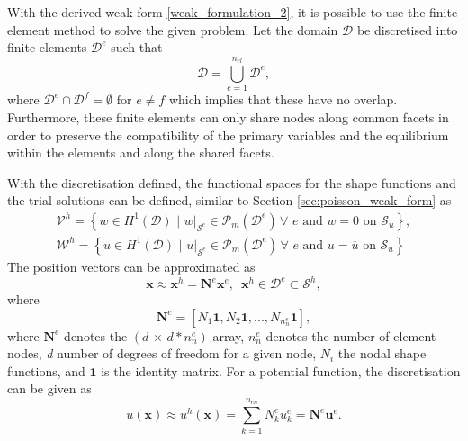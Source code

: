 With the derived weak form \eqref{weak_formulation_2}, it is possible to use the finite element method to solve the given problem.
Let the domain $\mathcal{D}$ be discretised into finite elements $\mathcal{D}^{e}$ such that
\begin{equation}\label{discretisation_definition}
    {\mathcal{D}} = \bigcup^{n_{el}}_{e=1} {\mathcal{D}}^{e},
\end{equation}
where $\mathcal{D}^{e} \cap \mathcal{D}^{f} = \emptyset \, \, \text{for } e \neq f$ which implies that these have no overlap.
 Furthermore, these finite elements can only share nodes along common facets in order to preserve the compatibility 
 of the primary variables and the equilibrium within the elements and along the shared facets. 
 
With the discretisation defined, the functional spaces for the shape functions and the trial solutions can be defined, similar to Section
 \ref{sec:poisson_weak_form} as
\begin{align}\label{discretised_spaces}
    \mathcal{V}^{h} = \left\{w \in H^{1}(\mathcal{D})\,\, |\,\, w|_{\mathcal{S}^{e}} \in \mathcal{P}_{m}(\mathcal{D}^{e}) \, \forall \,\, e \text{ and } w = 0 \,\, \text{on } \mathcal{S}_{u}\right\},\\
    \mathcal{W}^{h} = \left\{u \in H^{1}(\mathcal{D})\,\, |\,\, u|_{\mathcal{S}^{e}} \in \mathcal{P}_{m}(\mathcal{D}^{e}) \, \forall \,\, e \text{ and } u = \overline{u} \,\, \text{on } \mathcal{S}_{u}\right\}
\end{align}
%
The position vectors can be approximated as
\begin{equation} \label{pos_vectors}
    \boldsymbol{x} \approx \boldsymbol{x}^{h} = \mathbf{N}^{e}\mathbf{x}^{e}, \,\,\, \boldsymbol{x}^{h} \in \mathcal{D}^{e} \subset \mathcal{S}^{h},
\end{equation}
where
\begin{equation} \label{shape_functions}
    \mathbf{N}^{e} = [N_{1}\boldsymbol{1}, N_{2}\boldsymbol{1},...,N_{n^{e}_{n}}\boldsymbol{1}],
\end{equation}
where $\mathbf{N}^{e}$ denotes the $(d \, \times \, d*n^{e}_{n})$ array, $n^{e}_{n}$ denotes the number of element nodes, \emph{d} number of degrees of freedom
 for a given node, $N_{i}$ the nodal shape functions, and $\boldsymbol{1}$ is the identity matrix. For a potential function, the discretisation can be given as
 \begin{equation} \label{discretisation_def}
    u(\boldsymbol{x}) \approx u^{h}(\boldsymbol{x}) = \sum^{n_{en}}_{k=1} N^{e}_{k} u^{e}_{k} = \mathbf{N}^{e} \mathbf{u}^{e}.
 \end{equation}
